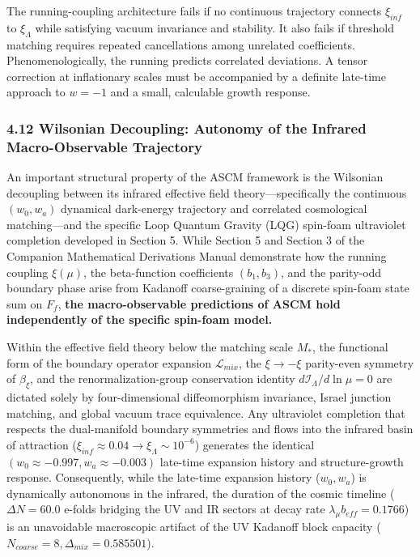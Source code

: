 \documentclass[aps,prd,onecolumn,superscriptaddress,nofootinbib,longbibliography,10pt]{revtex4-2}
\begin{document}
  The running-coupling architecture fails if no continuous trajectory connects \(\xi_{inf}\) to \(\xi_\Lambda\) while satisfying vacuum invariance and stability. It also fails if threshold matching requires repeated cancellations among unrelated coefficients. Phenomenologically, the running predicts correlated deviations. A tensor correction at inflationary scales must be accompanied by a definite late-time approach to \(w = -1\) and a small, calculable growth response.



  
\subsubsection*{4.12 Wilsonian Decoupling: Autonomy of the Infrared Macro-Observable Trajectory}

  An important structural property of the ASCM framework is the Wilsonian decoupling between its infrared effective field theory—specifically the continuous \((w_0, w_a)\) dynamical dark-energy trajectory and correlated cosmological matching—and the specific Loop Quantum Gravity (LQG) spin-foam ultraviolet completion developed in Section 5. While Section 5 and Section 3 of the Companion Mathematical Derivations Manual demonstrate how the running coupling \(\xi(\mu)\), the beta-function coefficients \((b_1, b_3)\), and the parity-odd boundary phase arise from Kadanoff coarse-graining of a discrete spin-foam state sum on \(F_f\), \textbf{the macro-observable predictions of ASCM hold independently of the specific spin-foam model.}


  Within the effective field theory below the matching scale \(M_*\), the functional form of the boundary operator expansion \(\mathcal{L}_{mix}\), the \(\xi \to -\xi\) parity-even symmetry of \(\beta_\xi\), and the renormalization-group conservation identity \(d\mathcal{I}_\Lambda/d\ln\mu = 0\) are dictated solely by four-dimensional diffeomorphism invariance, Israel junction matching, and global vacuum trace equivalence. Any ultraviolet completion that respects the dual-manifold boundary symmetries and flows into the infrared basin of attraction (\(\xi_{inf} \approx 0.04 \to \xi_\Lambda \sim 10^{-6}\)) generates the identical \((w_0 \approx -0.997, w_a \approx -0.003)\) late-time expansion history and structure-growth response. Consequently, while the late-time expansion history (\(w_0, w_a\)) is dynamically autonomous in the infrared, the duration of the cosmic timeline (\(\Delta N = 60.0\) e-folds bridging the UV and IR sectors at decay rate \(\lambda_\mu b_{eff} = 0.1766\)) is an unavoidable macroscopic artifact of the UV Kadanoff block capacity (\(N_{coarse} = 8, \Delta_{mix} = 0.585501\)).
\end{document}
